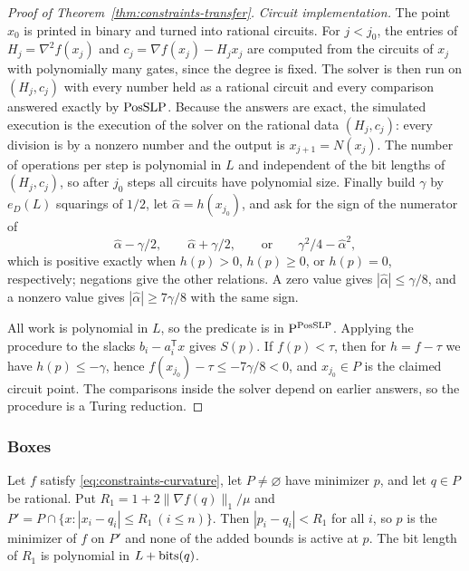 \begin{proof}[Proof of Theorem~\ref{thm:constraints-transfer}]
\emph{Circuit implementation.} The point $x_0$ is printed in binary and turned
into rational circuits. For $j<j_0$, the entries of $H_j=\nabla^2f(x_j)$ and
$c_j=\nabla f(x_j)-H_jx_j$ are computed from the circuits of $x_j$ with
polynomially many gates, since the degree is fixed. The solver is then run on
$(H_j,c_j)$ with every number held as a rational circuit and every comparison
answered exactly by $\mathrm{PosSLP}$. Because the answers are exact, the simulated
execution is the execution of the solver on the rational data $(H_j,c_j)$:
every division is by a nonzero number and the output is $x_{j+1}=N(x_j)$. The
number of operations per step is polynomial in $L$ and independent of the bit
lengths of $(H_j,c_j)$, so after $j_0$ steps all circuits have polynomial size.
Finally build $\gamma$ by $e_D(L)$ squarings of $1/2$, let $\hat\alpha=h(x_{j_0})$,
and ask for the sign of the numerator of
\[
 \hat\alpha-\gamma/2,\qquad \hat\alpha+\gamma/2,\qquad\text{or}\qquad
 \gamma^2/4-\hat\alpha^2,
\]
which is positive exactly when $h(p)>0$, $h(p)\ge0$, or $h(p)=0$,
respectively; negations give the other relations. A zero value gives
$|\hat\alpha|\le\gamma/8$, and a nonzero value gives
$|\hat\alpha|\ge7\gamma/8$ with the same sign.

All work is polynomial in $L$, so the predicate is in $\mathrm P^{\mathrm{PosSLP}}$.
Applying the procedure to the slacks $b_i-a_i^{\mathsf T}x$ gives $S(p)$. If
$f(p)<\tau$, then for $h=f-\tau$ we have $h(p)\le-\gamma$, hence
$f(x_{j_0})-\tau\le-7\gamma/8<0$, and $x_{j_0}\in P$ is the claimed circuit
point. The comparisons inside the solver depend on earlier answers, so the
procedure is a Turing reduction.
\end{proof}

\subsubsection{Boxes}
\label{app:constraints-boxes}

\begin{lemma}
\label{lem:constraints-truncation}
Let $f$ satisfy \eqref{eq:constraints-curvature}, let $P\ne\varnothing$ have
minimizer $p$, and let $q\in P$ be rational. Put
$R_1=1+2\|\nabla f(q)\|_1/\mu$ and
$P'=P\cap\{x:|x_i-q_i|\le R_1\ (i\le n)\}$. Then $|p_i-q_i|<R_1$ for all
$i$, so $p$ is the minimizer of $f$ on $P'$ and none of the added bounds is
active at $p$. The bit length of $R_1$ is polynomial in $L+\operatorname{bits}(q)$.
\end{lemma}

